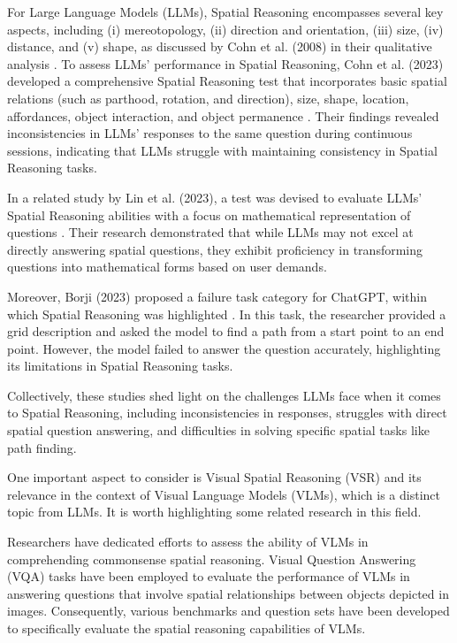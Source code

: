 \documentclass[journal,10pt]{IEEEtran}
\begin{document}
For Large Language Models (LLMs), Spatial Reasoning encompasses several key aspects, including (i) mereotopology, (ii) direction and orientation, (iii) size, (iv) distance, and (v) shape, as discussed by Cohn et al. (2008) in their qualitative analysis \cite{cohn2008qualitative}. To assess LLMs' performance in Spatial Reasoning, Cohn et al. (2023) developed a comprehensive Spatial Reasoning test that incorporates basic spatial relations (such as parthood, rotation, and direction), size, shape, location, affordances, object interaction, and object permanence \cite{cohn2023dialectical}. Their findings revealed inconsistencies in LLMs' responses to the same question during continuous sessions, indicating that LLMs struggle with maintaining consistency in Spatial Reasoning tasks.

In a related study by Lin et al. (2023), a test was devised to evaluate LLMs' Spatial Reasoning abilities with a focus on mathematical representation of questions \cite{lin2023using}. Their research demonstrated that while LLMs may not excel at directly answering spatial questions, they exhibit proficiency in transforming questions into mathematical forms based on user demands.

Moreover, Borji (2023) proposed a failure task category for ChatGPT, within which Spatial Reasoning was highlighted \cite{borji2023categorical}. In this task, the researcher provided a grid description and asked the model to find a path from a start point to an end point. However, the model failed to answer the question accurately, highlighting its limitations in Spatial Reasoning tasks.

Collectively, these studies shed light on the challenges LLMs face when it comes to Spatial Reasoning, including inconsistencies in responses, struggles with direct spatial question answering, and difficulties in solving specific spatial tasks like path finding. 

One important aspect to consider is Visual Spatial Reasoning (VSR) and its relevance in the context of Visual Language Models (VLMs), which is a distinct topic from LLMs. It is worth highlighting some related research in this field.

Researchers have dedicated efforts to assess the ability of VLMs in comprehending commonsense spatial reasoning. Visual Question Answering (VQA) tasks have been employed to evaluate the performance of VLMs in answering questions that involve spatial relationships between objects depicted in images\cite{7410636}. Consequently, various benchmarks and question sets have been developed to specifically evaluate the spatial reasoning capabilities of VLMs.
\end{document}
